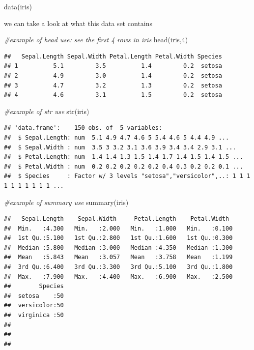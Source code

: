 \documentclass[
]{article}
\newenvironment{Shaded}{\begin{snugshade}}{\end{snugshade}}
\newcommand{\CommentTok}[1]{\textcolor[rgb]{0.56,0.35,0.01}{\textit{#1}}}
\newcommand{\DecValTok}[1]{\textcolor[rgb]{0.00,0.00,0.81}{#1}}
\newcommand{\FunctionTok}[1]{\textcolor[rgb]{0.00,0.00,0.00}{#1}}
\newcommand{\NormalTok}[1]{#1}
\begin{document}
\begin{Shaded}
\begin{Highlighting}[]
\FunctionTok{data}\NormalTok{(iris)}
\end{Highlighting}
\end{Shaded}

we can take a look at what this data set contains

\begin{Shaded}
\begin{Highlighting}[]
\CommentTok{\#example of head use: see the first 4 rows in iris}
\FunctionTok{head}\NormalTok{(iris,}\DecValTok{4}\NormalTok{)}
\end{Highlighting}
\end{Shaded}

\begin{verbatim}
##   Sepal.Length Sepal.Width Petal.Length Petal.Width Species
## 1          5.1         3.5          1.4         0.2  setosa
## 2          4.9         3.0          1.4         0.2  setosa
## 3          4.7         3.2          1.3         0.2  setosa
## 4          4.6         3.1          1.5         0.2  setosa
\end{verbatim}

\begin{Shaded}
\begin{Highlighting}[]
\CommentTok{\#example of str use}
\FunctionTok{str}\NormalTok{(iris)}
\end{Highlighting}
\end{Shaded}

\begin{verbatim}
## 'data.frame':    150 obs. of  5 variables:
##  $ Sepal.Length: num  5.1 4.9 4.7 4.6 5 5.4 4.6 5 4.4 4.9 ...
##  $ Sepal.Width : num  3.5 3 3.2 3.1 3.6 3.9 3.4 3.4 2.9 3.1 ...
##  $ Petal.Length: num  1.4 1.4 1.3 1.5 1.4 1.7 1.4 1.5 1.4 1.5 ...
##  $ Petal.Width : num  0.2 0.2 0.2 0.2 0.2 0.4 0.3 0.2 0.2 0.1 ...
##  $ Species     : Factor w/ 3 levels "setosa","versicolor",..: 1 1 1 1 1 1 1 1 1 1 ...
\end{verbatim}

\begin{Shaded}
\begin{Highlighting}[]
\CommentTok{\#example of summary use}
\FunctionTok{summary}\NormalTok{(iris)}
\end{Highlighting}
\end{Shaded}

\begin{verbatim}
##   Sepal.Length    Sepal.Width     Petal.Length    Petal.Width   
##  Min.   :4.300   Min.   :2.000   Min.   :1.000   Min.   :0.100  
##  1st Qu.:5.100   1st Qu.:2.800   1st Qu.:1.600   1st Qu.:0.300  
##  Median :5.800   Median :3.000   Median :4.350   Median :1.300  
##  Mean   :5.843   Mean   :3.057   Mean   :3.758   Mean   :1.199  
##  3rd Qu.:6.400   3rd Qu.:3.300   3rd Qu.:5.100   3rd Qu.:1.800  
##  Max.   :7.900   Max.   :4.400   Max.   :6.900   Max.   :2.500  
##        Species  
##  setosa    :50  
##  versicolor:50  
##  virginica :50  
##                 
##                 
## 
\end{verbatim}
\end{document}
